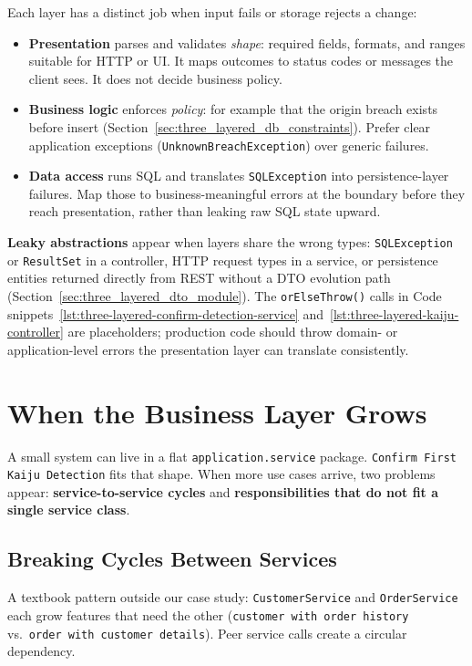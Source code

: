 Each layer has a distinct job when input fails or storage rejects a change:
\begin{itemize}
    \item \textbf{Presentation} parses and validates \textit{shape}: required fields, formats, and ranges suitable for HTTP or UI. It maps outcomes to status codes or messages the client sees. It does not decide business policy.
    \item \textbf{Business logic} enforces \textit{policy}: for example that the origin breach exists before insert (Section~\ref{sec:three_layered_db_constraints}). Prefer clear application exceptions (\texttt{UnknownBreachException}) over generic failures.
    \item \textbf{Data access} runs SQL and translates \texttt{SQLException} into persistence-layer failures. Map those to business-meaningful errors at the boundary before they reach presentation, rather than leaking raw SQL state upward.
\end{itemize}

\textbf{Leaky abstractions} appear when layers share the wrong types: \texttt{SQLException} or \texttt{ResultSet} in a controller, HTTP request types in a service, or persistence entities returned directly from REST without a DTO evolution path (Section~\ref{sec:three_layered_dto_module}). The \texttt{orElseThrow()} calls in Code snippets~\ref{lst:three-layered-confirm-detection-service} and~\ref{lst:three-layered-kaiju-controller} are placeholders; production code should throw domain- or application-level errors the presentation layer can translate consistently.

\section{When the Business Layer Grows}
\label{sec:three_layered_bll_grows}

A small system can live in a flat \texttt{application.service} package. \texttt{Confirm First Kaiju Detection} fits that shape. When more use cases arrive, two problems appear: \textbf{service-to-service cycles} and \textbf{responsibilities that do not fit a single service class}.

\subsection{Breaking Cycles Between Services}
\label{sec:three_layered_sublayers_circular}

A textbook pattern outside our case study: \texttt{CustomerService} and \texttt{OrderService} each grow features that need the other (\texttt{customer with order history} vs.\ \texttt{order with customer details}). Peer service calls create a circular dependency.

